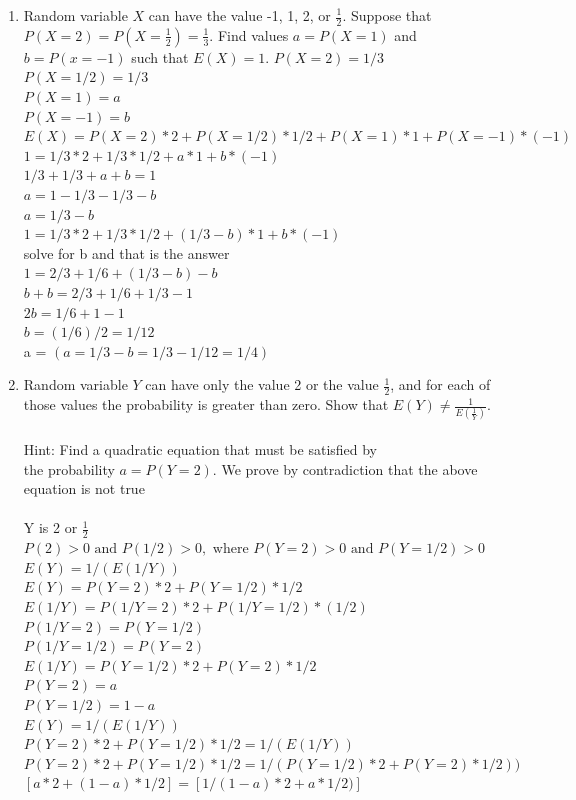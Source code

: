 \documentclass[12pt]{article}
\begin{document}
\begin{enumerate}
\begin{enumerate}
\item Random variable $X$ can have the value -1, 1, 2, or $\frac{1}{2}$. Suppose that $P(X = 2) = P(X = \frac{1}{2}) = \frac{1}{3}$. Find values $a = P(X = 1)$ and $b = P(x = -1)$ such that $E(X) = 1$.
$ P(X = 2) = 1/3$\\
$P(X = 1/2) = 1/3$\\
$P(X = 1) = a$\\
$P(X = -1) = b$\\
$E(X) = P(X=2)*2 + P(X=1/2)*1/2 + P(X=1)*1 + P(X=-1)*(-1)$\\
$1 = 1/3*2 + 1/3*1/2 + a*1 + b*(-1)$\\
$1/3 + 1/3 + a + b = 1$\\
$a = 1 - 1/3 - 1/3 - b$\\
$a = 1/3-b$\\
$1 = 1/3*2 + 1/3*1/2 + (1/3-b)*1 + b*(-1)$\\
solve for b and that is the answer \\
$1 = 2/3 + 1/6 + (1/3-b) - b$\\
$b + b = 2/3 + 1/6 + 1/3 - 1$\\
$2b = 1/6 + 1 - 1$\\
$b = (1/6)/2 = 1/12$\\
a = $(a = 1/3 - b = 1/3 - 1/12 = 1/4)$\\
\item Random variable $Y$ can have only the value 2 or the value $\frac{1}{2}$, and for each of those values the probability is greater than zero. Show that $E(Y) \neq \frac{1}{E(\frac{1}{Y})}.$\\\\
Hint: Find a quadratic equation that must be satisfied by\\ the probability $a = P(Y = 2).$
  We prove by contradiction that the above equation is not true \\\\
  Y is 2 or $\frac{1}{2}$\\
  $P(2) > 0 \text{ and } P(1/2) > 0, \text{ where } P(Y = 2) > 0 \text{ and } P(Y = 1/2) > 0$ \\
  $E( Y) = 1/(E(1/Y))$ \\
  $E(Y ) = P(Y=2)*2 + P(Y=1/2)*1/2$ \\
  $E(1/Y) = P(1/Y = 2)*2 + P(1/Y = 1/2)*(1/2)$ \\
  $P(1/Y = 2) = P(Y = 1/2)$ \\
  $P(1/Y = 1/2) = P(Y = 2)$\\
  $E(1/Y) = P(Y=1/2)*2 + P(Y=2)*1/2$ \\
  $P(Y=2) = a$\\
  $P(Y=1/2) = 1-a$\\
  $E(Y ) = 1/(E(1/Y))$ \\
  $P(Y=2)*2 + P(Y=1/2)*1/2 = 1/(E(1/Y))$\\
  $ P(Y=2)*2 + P(Y=1/2)*1/2 = 1/( P(Y=1/2)*2 + P(Y=2)*1/2))$ \\
  $ [a *2 + (1 - a)*1/2] = [1/( 1-a)*2 + a*1/2)] $\\\\


\end{enumerate}
\end{enumerate}
\end{document}

